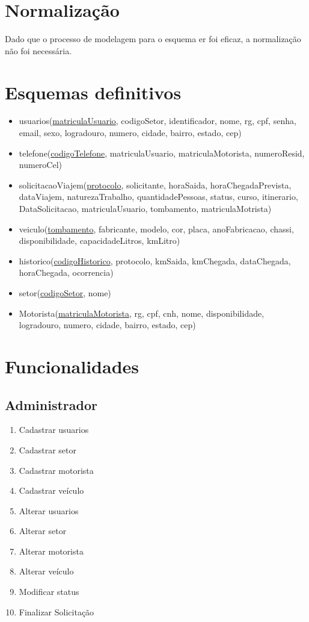 \documentclass[11pt]{article}
\begin{document}
\section{Normalização}
Dado que o processo de modelagem para o esquema er foi eficaz, a normalização não foi necessária.

\section{Esquemas definitivos}
\begin{itemize}

\item usuarios(\underline{matriculaUsuario}, codigoSetor, identificador, nome, rg, cpf, senha, email, sexo, logradouro, numero, cidade, bairro, estado, cep)

\item telefone(\underline{codigoTelefone}, matriculaUsuario, matriculaMotorista, numeroResid, numeroCel)

\item solicitacaoViajem(\underline{protocolo}, solicitante, horaSaida, horaChegadaPrevista, dataViajem, naturezaTrabalho, quantidadePessoas, status, curso, itinerario, DataSolicitacao, matriculaUsuario, tombamento, matriculaMotrista)

\item veiculo(\underline{tombamento}, fabricante, modelo, cor, placa, anoFabricacao, chassi, disponibilidade, capacidadeLitros, kmLitro)

\item historico(\underline{codigoHistorico}, protocolo, kmSaida, kmChegada, dataChegada, horaChegada, ocorrencia)

\item setor(\underline{codigoSetor}, nome)

\item Motorista(\underline{matriculaMotorista}, rg, cpf, cnh, nome, disponibilidade, logradouro, numero, cidade, bairro, estado, cep)

\end{itemize}

\section{Funcionalidades}
\subsection{Administrador}
\begin{enumerate}
\item Cadastrar usuarios
\item Cadastrar setor
\item Cadastrar motorista
\item Cadastrar veículo
\item Alterar usuarios
\item Alterar setor
\item Alterar motorista
\item Alterar veículo
\item Modificar status
\item Finalizar Solicitação
\end{enumerate}
\end{document}
